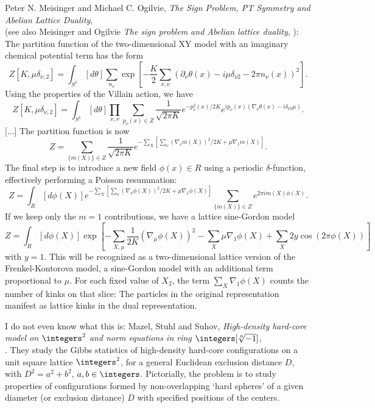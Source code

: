 \begin{description}

     {
Peter N. Meisinger and Michael C. Ogilvie, %
{\em The Sign Problem, PT Symmetry and Abelian Lattice Duality},
\\
(see also Meisinger and Ogilvie {\em The sign problem and Abelian lattice
duality}, ):
The partition function of the two-dimensional XY model with an imaginary
chemical potential term has the form
\[
Z[K,\mu\delta_{\nu,2}]=\int_{S^{1}}\left[d\theta\right]\sum_{n_{\nu}}\exp\left[-\frac{K}{2}\sum_{x,\nu}\left(\partial_{\nu}\theta\left(x\right)-i\mu\delta_{\nu2}-2\pi n_{\nu}\left(x\right)\right)^{2}\right].
\]
Using the properties of the Villain action, we have
\[
Z[K,\mu\delta_{\nu,2}]=\int_{S^{1}}\left[d\theta\right]\prod_{x,\nu}\sum_{p_{\nu}\left(x\right)\in Z}\frac{1}{\sqrt{2\pi K}}e^{-p_{\nu}^{2}\left(x\right)/2K}e^{ip_{\nu}\left(x\right)\left(\nabla_{\nu}\theta\left(x\right)-i\delta_{\nu2}\mu\right)}.
\]
[...]
The partition function is now
\[
Z=\sum_{\{m\left(X\right)\}\in Z}\frac{1}{\sqrt{2\pi K}}e^{-\sum_{X}\left[\sum_{\nu}\left(\nabla_{\nu}m\left(X\right)\right)^{2}/2K+\mu\nabla_{1}m\left(X\right)\right]}.
\]
The final step is to introduce a new field $\phi(x)\in R$ using a
periodic $\delta$-function, effectively performing a Poisson resummation:
\[
Z=\int_{R}\left[d\phi\left(X\right)\right]e^{-\sum_{X}\left[\sum_{\nu}\left(\nabla_{\nu}\phi\left(X\right)\right)^{2}/2K+\mu\nabla_{1}\phi\left(X\right)\right]}\sum_{\{m\left(X\right)\}\in Z}e^{2\pi im\left(X\right)\phi\left(X\right)}.
\]
If we keep only the $m=1$ contributions, we have a lattice sine-Gordon
model
\[
Z=\int_{R}\left[d\phi\left(X\right)\right]\exp\left[-\sum_{X,\mu}\frac{1}{2K}\left(\nabla_{\mu}\phi\left(X\right)\right)^{2}-\sum_{X}\mu\nabla_{1}\phi\left(X\right)+\sum_{X}2y\cos\left(2\pi\phi\left(X\right)\right)\right]
\]
with $y=1$. This will be recognized as a two-dimensional lattice
version of the Frenkel-Kontorova model, a sine-Gordon model with an
additional term proportional to $\mu$. For each fixed value of $X_{2}$,
the term $\sum_{X}\nabla_{1}\phi\left(X\right)$ counts the number
of kinks on that slice: The particles in the original representation
manifest as lattice kinks in the dual representation.

        } %

     {
I do not even know what this is:
Mazel, Stuhl and Suhov,
{\em High-density hard-core model on $\integers^2$
and norm equations in ring $\integers [{\sqrt[6]{-1}}]$},\\
. They study the Gibbs statistics of high-density
hard-core configurations on a unit square lattice $\integers^2$, for a
general Euclidean exclusion distance $D$, with $D^2=a^2+b^2$,
$a,b\in\integers$. Pictorially, the problem is to study properties of
configurations formed by non-overlapping `hard spheres' of a given
diameter (or exclusion distance) $D$ with specified positions of the
centers.

}
\end{description}

